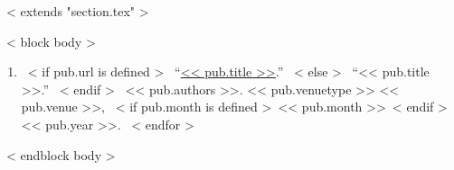 ~< extends "section.tex" >~

~< block body >~
  \begin{enumerate}
    ~< for pub in items >~
      \item{
        ~< if pub.url is defined >~
          ``\href{<< pub.url >>}{<< pub.title >>}.''
        ~< else >~
          ``<< pub.title >>.''
        ~< endif >~
        << pub.authors >>.
        << pub.venuetype >>
        << pub.venue >>,
        ~< if pub.month is defined >~<< pub.month >>~< endif >~
        << pub.year >>.
      }
    ~< endfor >~
  \end{enumerate}
~< endblock body >~
